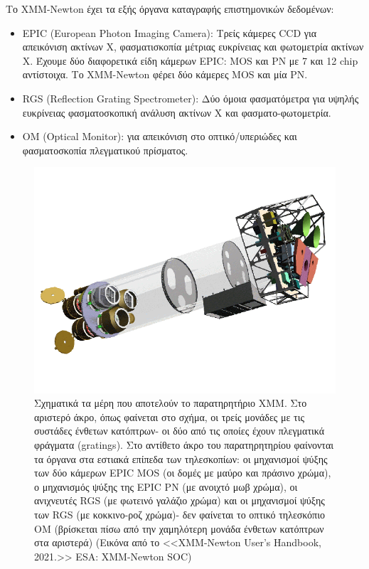 Το \textlatin{XMM-Νewton} έχει τα εξής όργανα καταγραφής επιστημονικών δεδομένων\cite{Handbook}: 
\begin{itemize}
    \item \textlatin{EPIC (European Photon Imaging Camera):} Τρείς κάμερες \textlatin{CCD} για απεικόνιση ακτίνων Χ, φασματισκοπία μέτριας ευκρίνειας και φωτομετρία ακτίνων Χ. Έχουμε δύο διαφορετικά είδη κάμερων \textlatin{EPIC}: \textlatin{MOS} και ΡΝ με 7 και 12 \textlatin{chip} αντίστοιχα. Το \textlatin{XMM-Νewton} φέρει δύο κάμερες \textlatin{MOS} και μία ΡΝ.
    \item \textlatin{RGS (Reflection Grating Spectrometer):}  Δύο όμοια φασματόμετρα για υψηλής ευκρίνειας φασματοσκοπική ανάλυση ακτίνων Χ και φασματο-φωτομετρία.
    \item \textlatin{ΟΜ (Optical Monitor):}  για απεικόνιση στο οπτικό/υπεριώδες και φασματοσκοπία πλεγματικού πρίσματος.
\end{itemize}

\begin{figure}
 \begin{center}
 \includegraphics[width=0.9\linewidth]{Figures/img33.png}
 \caption{Σχηματικά τα μέρη που αποτελούν το παρατηρητήριο \textlatin{XMM}. Στο αριστερό άκρο, όπως φαίνεται στο σχήμα, οι τρείς μονάδες με τις συστάδες ένθετων κατόπτρων- οι δύο από τις οποίες έχουν πλεγματικά φράγματα (\textlatin{gratings}). Στο αντίθετο άκρο του παρατηρητηρίου φαίνονται τα όργανα στα εστιακά επίπεδα των τηλεσκοπίων: οι μηχανισμοί ψύξης των δύο κάμερων \textlatin{EPIC MOS} (οι δομές με μαύρο και πράσινο χρώμα), ο μηχανισμός ψύξης της \textlatin{EPIC} ΡΝ (με ανοιχτό μωβ χρώμα), οι ανιχνευτές \textlatin{RGS} (με φωτεινό γαλάζιο χρώμα) και οι μηχανισμοί ψύξης των \textlatin{RGS} (με κοκκινο-ροζ χρώμα)- δεν φαίνεται το οπτικό τηλεσκόπιο ΟΜ (βρίσκεται πίσω από την χαμηλότερη μονάδα ένθετων κατόπτρων στα αριστερά) (Εικόνα από το <<\textlatin{XMM-Newton User's Handbook, 2021.}>> \textlatin{ESA: XMM-Newton SOC})}
 \label{fig:XMMsketch}
 \end{center}
 \end{figure}


